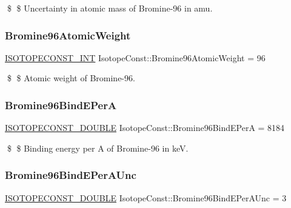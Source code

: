 \$ \$ Uncertainty in atomic mass of Bromine-\/96 in amu. \mbox{\label{group___isotope_const-_bromine-_br96_gaff04186f7e8b1f7a84ec34f177ef5556}} 
\subsubsection{\texorpdfstring{Bromine96\+Atomic\+Weight}{Bromine96AtomicWeight}}
{\footnotesize\ttfamily \mbox{\hyperlink{group___isotope_const-_macros_ga5f18360b3e99483a35c32d789e62621c}{I\+S\+O\+T\+O\+P\+E\+C\+O\+N\+S\+T\+\_\+\+I\+NT}} Isotope\+Const\+::\+Bromine96\+Atomic\+Weight = 96}

\$ \$ Atomic weight of Bromine-\/96. \mbox{\label{group___isotope_const-_bromine-_br96_ga2465619a0b613ace22c3c87ad7eaa61e}} 
\subsubsection{\texorpdfstring{Bromine96\+Bind\+E\+PerA}{Bromine96BindEPerA}}
{\footnotesize\ttfamily \mbox{\hyperlink{group___isotope_const-_macros_ga8f45a7272ce02c0b4c65c44636ed719a}{I\+S\+O\+T\+O\+P\+E\+C\+O\+N\+S\+T\+\_\+\+D\+O\+U\+B\+LE}} Isotope\+Const\+::\+Bromine96\+Bind\+E\+PerA = 8184}

\$ \$ Binding energy per A of Bromine-\/96 in keV. \mbox{\label{group___isotope_const-_bromine-_br96_ga88c527d00bba58785e15fb563eb107a2}} 
\subsubsection{\texorpdfstring{Bromine96\+Bind\+E\+Per\+A\+Unc}{Bromine96BindEPerAUnc}}
{\footnotesize\ttfamily \mbox{\hyperlink{group___isotope_const-_macros_ga8f45a7272ce02c0b4c65c44636ed719a}{I\+S\+O\+T\+O\+P\+E\+C\+O\+N\+S\+T\+\_\+\+D\+O\+U\+B\+LE}} Isotope\+Const\+::\+Bromine96\+Bind\+E\+Per\+A\+Unc = 3}

